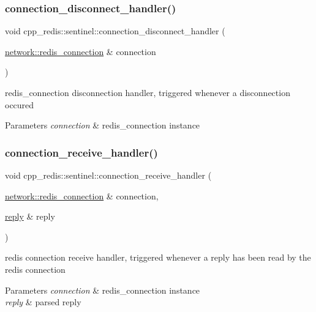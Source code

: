 \subsubsection{\texorpdfstring{connection\+\_\+disconnect\+\_\+handler()}{connection\_disconnect\_handler()}}
{\footnotesize\ttfamily void cpp\+\_\+redis\+::sentinel\+::connection\+\_\+disconnect\+\_\+handler (\begin{DoxyParamCaption}\item[{\hyperlink{classcpp__redis_1_1network_1_1redis__connection}{network\+::redis\+\_\+connection} \&}]{connection }\end{DoxyParamCaption})\hspace{0.3cm}{\ttfamily [private]}}

redis\+\_\+connection disconnection handler, triggered whenever a disconnection occured


\begin{DoxyParams}{Parameters}
{\em connection} & redis\+\_\+connection instance \\
\hline
\end{DoxyParams}
\mbox{\label{classcpp__redis_1_1sentinel_af18d66cd6f5fc4408800fe16201cf9c8}} 
\subsubsection{\texorpdfstring{connection\+\_\+receive\+\_\+handler()}{connection\_receive\_handler()}}
{\footnotesize\ttfamily void cpp\+\_\+redis\+::sentinel\+::connection\+\_\+receive\+\_\+handler (\begin{DoxyParamCaption}\item[{\hyperlink{classcpp__redis_1_1network_1_1redis__connection}{network\+::redis\+\_\+connection} \&}]{connection,  }\item[{\hyperlink{classcpp__redis_1_1reply}{reply} \&}]{reply }\end{DoxyParamCaption})\hspace{0.3cm}{\ttfamily [private]}}

redis connection receive handler, triggered whenever a reply has been read by the redis connection


\begin{DoxyParams}{Parameters}
{\em connection} & redis\+\_\+connection instance \\
\hline
{\em reply} & parsed reply \\
\hline
\end{DoxyParams}
\mbox{\label{classcpp__redis_1_1sentinel_af607d8c5a20ada35daad251f1b1b2f68}} 

